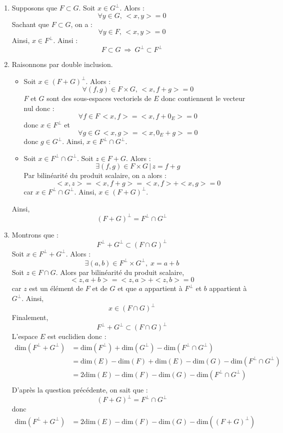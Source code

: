 \documentclass[a4paper,10pt]{report}
\begin{document}
\begin{enumerate}
\item Supposons que $F\subset G$. Soit $x \in G^{\perp}$. Alors :
$$ \forall y \in G, \, <x,y>=0$$
Sachant que $F \subset G$, on a :
$$ \forall y \in F, \, <x,y>=0$$
Ainsi, $x \in F^{\perp}$. Ainsi :
$$F\subset G \ \Longrightarrow \ G^{\perp}\subset F^{\perp}$$
\item Raisonnons par double inclusion.
\begin{itemize}
\item Soit $x \in (F+G)^{\perp}$. Alors :
$$ \forall (f,g) \in F \times G, \, <x,f+g>=0$$
$F$ et $G$ sont des sous-espaces vectoriels de $E$ donc contiennent le vecteur nul donc :
$$ \forall f \in F  \, <x,f>=<x,f+0_E>=0$$
donc $x \in F^{\perp}$ et 
$$ \forall g \in G  \, <x,g>=<x,0_E+g>=0$$
donc $g \in G^{\perp}$. Ainsi, $x \in F^{\perp}\cap G^{\perp}$.
\item Soit $x \in F^{\perp}\cap G^{\perp}$. Soit $z \in F+G$. Alors :
$$ \exists (f,g) \in F \times G \, \vert \, z=f+g$$
Par bilinéarité du produit scalaire, on a alors :
$$ <x,z>=<x,f+g> = <x,f>+<x,g> = 0$$
car $x \in F^{\perp}\cap G^{\perp}$. Ainsi, $x \in (F+G)^{\perp}$.
\end{itemize}
Ainsi,
$$(F+G)^{\perp}=F^{\perp}\cap G^{\perp}$$
\item Montrons que :
$$ F^{\perp}+G^{\perp} \subset (F\cap G)^{\perp}$$
Soit $x \in F^{\perp}+G^{\perp}$. Alors :
$$ \exists (a,b) \in F^{\perp} \times G^{\perp}, \; x=a+b$$
Soit $z \in F \cap G$. Alors par bilinéarité du produit scalaire,
$$ <z,a+b>=<z,a>+<z,b>=0$$
car $z$ est un élément de $F$ et de $G$ et que $a$ appartient à $F^{\perp}$ et $b$ appartient à $G^{\perp}$. Ainsi,
$$ x \in (F\cap G)^{\perp}$$
Finalement,
$$ F^{\perp}+G^{\perp} \subset (F\cap G)^{\perp}$$
L'espace $E$ est euclidien donc :
\begin{align*}
 \textrm{dim}(F^{\perp}+G^{\perp}) & =  \textrm{dim}(F^{\perp}) +  \textrm{dim}(G^{\perp}) -  \textrm{dim}(F^{\perp} \cap G^{\perp}) \\
 & = \textrm{dim}(E) - \textrm{dim}(F) + \textrm{dim}(E)- \textrm{dim}(G) - \textrm{dim}(F^{\perp} \cap G^{\perp}) \\ 
 & = 2 \textrm{dim}(E) - \textrm{dim}(F) - \textrm{dim}(G) - \textrm{dim}(F^{\perp} \cap G^{\perp})\\
\end{align*}
D'après la question précédente, on sait que :
$$ (F+G)^{\perp}=F^{\perp}\cap G^{\perp}$$ 
donc 
 \begin{align*}
 \textrm{dim}(F^{\perp}+G^{\perp}) & = 2 \textrm{dim}(E) - \textrm{dim}(F) - \textrm{dim}(G) - \textrm{dim}((F+G)^{\perp})\\

\end{align*}
\end{enumerate}
\end{document}

